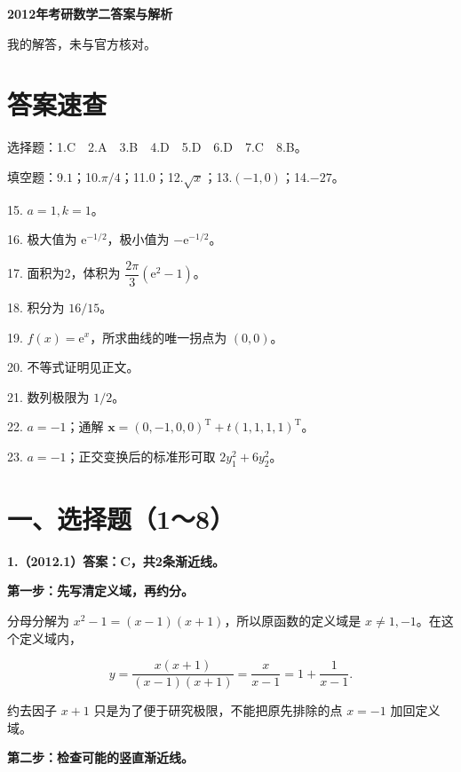 \documentclass[UTF8,11pt,fontset=windows]{ctexart}
\begin{document}
{\LARGE\bfseries 2012年考研数学二答案与解析\par}\vspace{6pt}

\begingroup\color{gray}我的解答，未与官方核对。\par\endgroup

\section*{答案速查}

\begingroup\color{gray}选择题：1.C　2.A　3.B　4.D　5.D　6.D　7.C　8.B。\par\endgroup

\begingroup\color{gray}填空题：9.$1$；10.$\pi/4$；11.$0$；12.$\sqrt x$；13.$(-1,0)$；14.$-27$。\par\endgroup

15. $a=1,k=1$。

16. 极大值为 $\mathrm e^{-1/2}$，极小值为 $-\mathrm e^{-1/2}$。

17. 面积为2，体积为 $\dfrac{2\pi}{3}(\mathrm e^2-1)$。

18. 积分为 $16/15$。

19. $f(x)=\mathrm e^x$，所求曲线的唯一拐点为 $(0,0)$。

20. 不等式证明见正文。

21. 数列极限为 $1/2$。

22. $a=-1$；通解 $\boldsymbol x=(0,-1,0,0)^{\mathrm T}+t(1,1,1,1)^{\mathrm T}$。

23. $a=-1$；正交变换后的标准形可取 $2y_1^2+6y_2^2$。

\clearpage

\section*{一、选择题（1～8）}

\textbf{1.（2012.1）答案：C，共2条渐近线。}

\textbf{第一步：先写清定义域，再约分。}

分母分解为 $x^2-1=(x-1)(x+1)$，所以原函数的定义域是 $x\ne1,-1$。在这个定义域内，

$$
y=\frac{x(x+1)}{(x-1)(x+1)}
=\frac{x}{x-1}
=1+\frac1{x-1}.
$$

约去因子 $x+1$ 只是为了便于研究极限，不能把原先排除的点 $x=-1$ 加回定义域。

\textbf{第二步：检查可能的竖直渐近线。}
\end{document}
